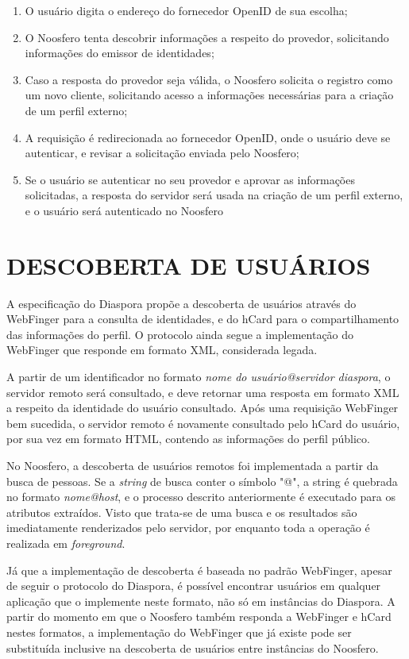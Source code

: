 \begin{enumerate}
  \item{O usuário digita o endereço do fornecedor OpenID de sua escolha;}
  \item{O Noosfero tenta descobrir informações a respeito do provedor, solicitando
        informações do emissor de identidades;}
  \item{Caso a resposta do provedor seja válida, o Noosfero solicita o registro como
        um novo cliente, solicitando acesso a informações necessárias para a criação
        de um perfil externo;}
  \item{A requisição é redirecionada ao fornecedor OpenID, onde o usuário deve se
        autenticar, e revisar a solicitação enviada pelo Noosfero;}
  \item{Se o usuário se autenticar no seu provedor e aprovar as informações
        solicitadas, a resposta do servidor será usada na criação de um perfil
        externo, e o usuário será autenticado no Noosfero}
\end{enumerate}

\section{DESCOBERTA DE USUÁRIOS}

A especificação do Diaspora propõe a descoberta de usuários através do WebFinger
para a consulta de identidades, e do hCard para o compartilhamento das informações
do perfil. O protocolo ainda segue a implementação do WebFinger que responde em
formato XML, considerada legada.

A partir de um identificador no formato \textit{nome do usuário@servidor diaspora}, o
servidor remoto será consultado, e deve retornar uma resposta em formato XML a
respeito da identidade do usuário consultado. Após uma requisição WebFinger bem
sucedida, o servidor remoto é novamente consultado pelo hCard do usuário, por sua
vez em formato HTML, contendo as informações do perfil público.

No Noosfero, a descoberta de usuários remotos foi implementada a partir da busca de
pessoas. Se a \textit{string} de busca conter o símbolo "@", a string é quebrada
no formato \textit{nome@host}, e o processo descrito anteriormente é executado
para os atributos extraídos. Visto que trata-se de uma busca e os resultados são
imediatamente renderizados pelo servidor, por enquanto toda a operação é realizada
em \textit{foreground}.

Já que a implementação de descoberta é baseada no padrão WebFinger, apesar de seguir
o protocolo do Diaspora, é possível encontrar usuários em qualquer aplicação que o
implemente neste formato, não só em instâncias do Diaspora. A partir do momento em
que o Noosfero também responda a WebFinger e hCard nestes formatos, a implementação
do WebFinger que já existe pode ser substituída inclusive na descoberta de usuários
entre instâncias do Noosfero.

